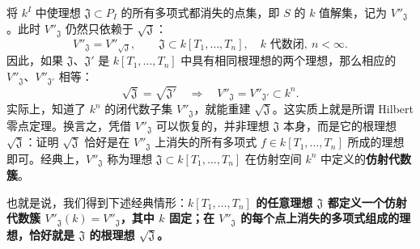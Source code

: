 将 $k^I$ 中使理想 $\mathfrak J\subset P_I$ 的所有多项式都消失的点集，即 $S$ 的 $k$ 值解集，记为 $V''_{\mathfrak J}$。此时 $V''_{\mathfrak J}$ 仍然只依赖于 $\sqrt{\mathfrak J}$：
\begin{equation}\tag{11.1}V''_{\mathfrak J}=V''_{\sqrt{\mathfrak J}},\qquad\mathfrak J\subset k[T_1,\ldots,T_n],\quad k\text{ 代数闭},\ n<\infty.
\end{equation}
因此，如果 $\mathfrak J$、$\mathfrak J'$ 是 $k[T_1,\ldots,T_n]$ 中具有相同根理想的两个理想，那么相应的 $V''_{\mathfrak J}$、$V''_{\mathfrak J'}$ 相等：
\begin{equation}\tag{11.2}\sqrt{\mathfrak J}=\sqrt{\mathfrak J'}\quad\Longrightarrow\quad V''_{\mathfrak J}=V''_{\mathfrak J'}\subset k^n.
\end{equation}
实际上，知道了 $k^n$ 的闭代数子集 $V''_{\mathfrak J}$，就能重建 $\sqrt{\mathfrak J}$。这实质上就是所谓 Hilbert 零点定理。换言之，凭借 $V''_{\mathfrak J}$ 可以恢复的，并非理想 $\mathfrak J$ 本身，而是它的根理想 $\sqrt{\mathfrak J}$：证明 $\sqrt{\mathfrak J}$ 恰好是在 $V''_{\mathfrak J}$ 上消失的所有多项式 $f\in k[T_1,\ldots,T_n]$ 所成的理想即可。经典上，$V''_{\mathfrak J}$ 称为理想 $\mathfrak J\subset k[T_1,\ldots,T_n]$ 在仿射空间 $k^n$ 中定义的\textbf{仿射代数簇}。

也就是说，我们得到下述经典情形：\textbf{$k[T_1,\ldots,T_n]$ 的任意理想 $\mathfrak J$ 都定义一个仿射代数簇 $V''_{\mathfrak J}(k)=V''_{\mathfrak J}$，其中 $k$ 固定；在 $V''_{\mathfrak J}$ 的每个点上消失的多项式组成的理想，恰好就是 $\mathfrak J$ 的根理想 $\sqrt{\mathfrak J}$。}

